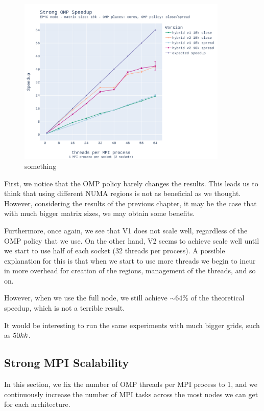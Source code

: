 \documentclass{report}
\begin{document}
\begin{figure}[H]
\centering
\includegraphics[width=10cm, height=8cm]{./images/strong_OMP_epyc_hybrid_grid_010k_speedup.pdf}
\caption{\label{fig:strongomp10kspeedupepyc} something}
\end{figure}

First, we notice that the OMP policy barely changes the results. This leads us 
to think that using different NUMA regions is not as beneficial as we thought. 
However, considering the results of the previous chapter, it may be the case 
that with much bigger matrix sizes, we may obtain some benefits.

Furthermore, once again, we see that V1 does not scale well, regardless of the 
OMP policy that we use. On the other hand, V2 seems to achieve scale well until 
we start to use half of each socket (32 threads per process). A possible explanation 
for this is that when we start to use more threads we begin to incur in more 
overhead for creation of the regions, management of the threads, and so on. 

However, when we use the full node, we still achieve $\sim 64\%$ of the theoretical 
speedup, which is not a terrible result.

It would be interesting to run the same experiments with much bigger grids, 
such as $50k \time 50k$.

\subsection{Strong MPI Scalability}

In this section, we fix the number of OMP threads per MPI process to 1, and we 
continuously increase the number of MPI tasks across the most nodes we can get 
for each architecture. 
\end{document}
